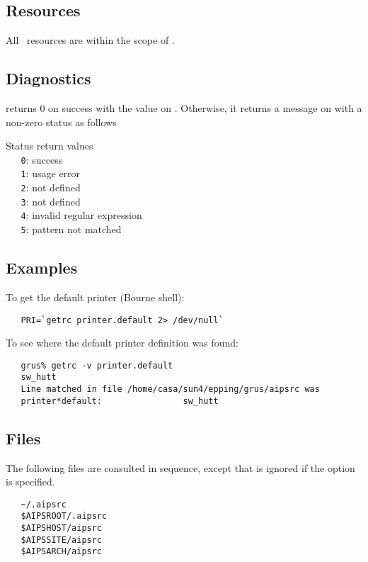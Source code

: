 \subsection*{Resources}

All \aipspp\ resources are within the scope of .

\subsection*{Diagnostics}

 returns 0 on success with the value on .  Otherwise,
it returns a message on  with a non-zero status as follows

Status return values
\\ \verb+   0+: success
\\ \verb+   1+: usage error
\\ \verb+   2+:  not defined
\\ \verb+   3+:  not defined
\\ \verb+   4+: invalid regular expression
\\ \verb+   5+: pattern not matched

\subsection*{Examples}

To get the default printer (Bourne shell):
\begin{verbatim}
   PRI=`getrc printer.default 2> /dev/null`
\end{verbatim}

\noindent
To see where the default printer definition was found:
\begin{verbatim}
   grus% getrc -v printer.default
   sw_hutt
   Line matched in file /home/casa/sun4/epping/grus/aipsrc was
   printer*default:                sw_hutt
\end{verbatim}

\subsection*{Files}

The following  files are consulted in sequence, except that
 is ignored if the  option is specified.

\begin{verbatim}
   ~/.aipsrc
   $AIPSROOT/.aipsrc
   $AIPSHOST/aipsrc
   $AIPSSITE/aipsrc
   $AIPSARCH/aipsrc
\end{verbatim}

